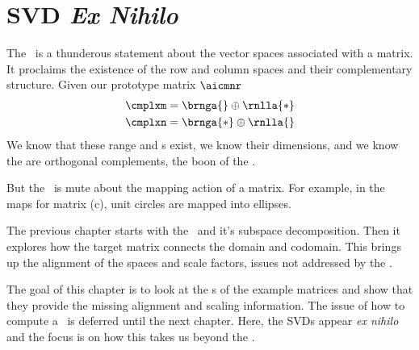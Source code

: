 \chapter{SVD {\it{Ex Nihilo}}}
%
The \ftola \ is a thunderous statement about the vector spaces associated with a matrix. It proclaims the existence of the row and column spaces and their complementary structure. Given our prototype matrix $\aicmnr$
\begin{equation}
  \begin{split}
    \cmplxm &= \brnga{}  \oplus \rnlla{*} \\
    \cmplxn &= \brnga{*} \oplus \rnlla{} \\
  \end{split}
\end{equation}
We know that these range and \ns s exist, we know their dimensions, and we know the are orthogonal complements, the boon of the \ft . 

But the \ft \ is mute about the mapping action of a matrix. For example, in the maps for matrix (c), unit circles are mapped into ellipses.  

The previous chapter starts with the \ftola \ and it's subspace decomposition. Then it explores how the target matrix connects the domain and codomain. This brings up the alignment of the spaces and scale factors, issues not addressed by the \ft. 

The goal of this chapter is to look at the \asvd s of the example matrices and show that they provide the missing alignment and scaling information. The issue of how to compute a \asvd \ is deferred until the next chapter. Here, the SVDs appear {\it{ex nihilo}} and the focus is on how this takes us beyond the \ftola.





\endinput